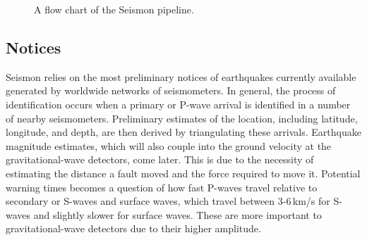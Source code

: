 \documentclass[reprint, prl, aps, showpacs]{revtex4-1}
\begin{document}
\begin{figure}[t]
 \begin{center}
 \end{center}
 \caption{A flow chart of the Seismon pipeline.}
 \label{fig:flowchart}
\end{figure}

\subsection{Notices}

Seismon relies on the most preliminary notices of earthquakes currently available generated by worldwide networks of seismometers. 
In general, the process of identification occurs when a primary or P-wave arrival is identified in a number of nearby seismometers.
Preliminary estimates of the location, including latitude, longitude, and depth, are then derived by triangulating these arrivals. 
Earthquake magnitude estimates, which will also couple into the ground velocity at the gravitational-wave detectors, come later.
This is due to the necessity of estimating the distance a fault moved and the force required to move it.
Potential warning times becomes a question of how fast P-waves travel relative to secondary or S-waves and surface waves, which travel between 3-6\,km/s for S-waves and slightly slower for surface waves. These are more important to gravitational-wave detectors due to their higher amplitude.
\end{document}
